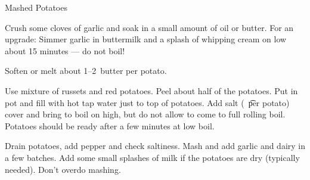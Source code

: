 
\begin{recipe}{Mashed Potatoes}
  \maketitle


  Crush some cloves of garlic and soak in a small amount of oil or butter. For an
  upgrade: Simmer garlic in buttermilk and a splash of whipping cream on low about 15
  minutes --- do not boil!

  Soften or melt about 1--2~\T butter per potato.

  Use mixture of russets and red potatoes. Peel about half of the potatoes. Put in
  pot and fill with hot tap water just to top of potatoes. Add salt (\eighth~\t per
  potato) cover and bring to boil on high, but do not allow to come to full rolling
  boil. Potatoes should be ready after a few minutes at low boil.

  Drain potatoes, add pepper and check saltiness. Mash and add garlic and dairy in a
  few batches. Add some small splashes of milk if the potatoes are dry (typically
  needed). Don't overdo mashing.
\end{recipe}


